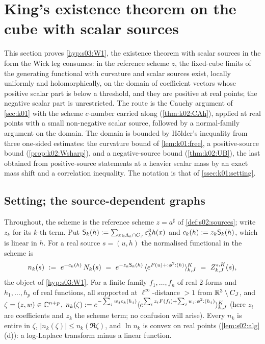 \section{King's existence theorem on the cube with scalar sources}\label{sec:k02}

This section proves \cref{hyp:s03:W1}, the existence theorem with scalar sources in the form the Wick leg consumes: in the reference scheme $z$, the fixed-cube limits of the generating functional with curvature and scalar sources exist, locally uniformly and holomorphically, on the domain of coefficient vectors whose positive scalar part is below a threshold, and they are positive at real points; the negative scalar part is unrestricted. The route is the Cauchy argument of \cref{sec:k01} with the scheme $c$-number carried along (\cref{thm:k02:CAh}), applied at real points with a small non-negative scalar source, followed by a normal-family argument on the domain. The domain is bounded by Hölder's inequality from three one-sided estimates: the curvature bound of \cref{lem:k01:free}, a positive-source bound (\cref{prop:k02:Wsharp}), and a negative-source bound (\cref{thm:k02:UB}), the last obtained from positive-source statements at a heavier scalar mass by an exact mass shift and a correlation inequality. The notation is that of \cref{ssec:k01:setting}.

\subsection{Setting; the source-dependent graphs}\label{ssec:k02:setting}

Throughout, the scheme is the reference scheme $z=a^\sharp$ of \cref{def:s02:sources}; write $z_k$ for its $k$-th term. Put $\mathsf S_k(h):=\sum_{x\in\Lambda_k\cap C_J}\varepsilon_k^3h(x)$ and $c_k(h):= z_k\mathsf S_k(h)$, which is linear in $h$. For a real source $s=(u,h)$ the normalised functional in the scheme is
\[
n_k(s)\ \defeq\ e^{-c_k(h)}\,N_k(s)\ =\ e^{-z_k\sS_k(h)}\,\avK{e^{F(u)+\Wick{h}}}\ =\ Z^{z,K}_{k,J}(s),
\]
the object of \cref{hyp:s03:W1}. For a finite family $f_1,\dots,f_n$ of real $2$-forms and $h_1,\dots,h_p$ of real functions, all supported at $\ell^\infty$-distance $>1$ from $\mathbb R^3\setminus C_J$, and $\zeta=(z,w)\in\mathbb C^{n+p}$, $n_k(\zeta):= e^{-\sum_jw_jc_k(h_j)}\langle e^{\sum_iz_iF(f_i)+\sum_jw_j{:}\phi^2{:}(h_j)}\rangle^{K}_{k,J}$ (here $z_i$ are coefficients and $z_k$ the scheme term; no confusion will arise). Every $n_k$ is entire in $\zeta$, $|n_k(\zeta)|\le n_k(\Re\zeta)$, and $\ln n_k$ is convex on real points (\cref{lem:s02:alg}(d)): a log-Laplace transform minus a linear function.

